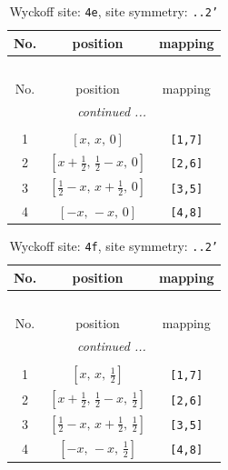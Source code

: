 \documentclass[fleqn,8pt]{jsarticle}
\begin{document}
\begin{longtable}{ccc}
\caption{Wyckoff site: {\tt 4e}, site symmetry: {\tt ..2'}}
 \\
 \hline \hline
No. & position & mapping \\ \hline \endfirsthead

\multicolumn{2}{l}{\tablename\ \thetable{}} \\
 \hline \hline
No. & position & mapping \\ \hline \endhead

 \hline \hline
\multicolumn{2}{r}{\footnotesize\it continued ...} \\ \endfoot

 \hline \hline
\multicolumn{2}{r}{} \\ \endlastfoot

1 & $\left[ x,\, x,\, 0 \right]$ & {\tt [1,7]} \\ \hline
2 & $\left[ x + \frac{1}{2},\, \frac{1}{2} - x,\, 0 \right]$ & {\tt [2,6]} \\ \hline
3 & $\left[ \frac{1}{2} - x,\, x + \frac{1}{2},\, 0 \right]$ & {\tt [3,5]} \\ \hline
4 & $\left[ - x,\, - x,\, 0 \right]$ & {\tt [4,8]} \\
\end{longtable}
\renewcommand{\arraystretch}{1.2}
\begin{longtable}{ccc}
\caption{Wyckoff site: {\tt 4f}, site symmetry: {\tt ..2'}}
 \\
 \hline \hline
No. & position & mapping \\ \hline \endfirsthead

\multicolumn{2}{l}{\tablename\ \thetable{}} \\
 \hline \hline
No. & position & mapping \\ \hline \endhead

 \hline \hline
\multicolumn{2}{r}{\footnotesize\it continued ...} \\ \endfoot

 \hline \hline
\multicolumn{2}{r}{} \\ \endlastfoot

1 & $\left[ x,\, x,\, \frac{1}{2} \right]$ & {\tt [1,7]} \\ \hline
2 & $\left[ x + \frac{1}{2},\, \frac{1}{2} - x,\, \frac{1}{2} \right]$ & {\tt [2,6]} \\ \hline
3 & $\left[ \frac{1}{2} - x,\, x + \frac{1}{2},\, \frac{1}{2} \right]$ & {\tt [3,5]} \\ \hline
4 & $\left[ - x,\, - x,\, \frac{1}{2} \right]$ & {\tt [4,8]} \\
\end{longtable}
\end{document}
